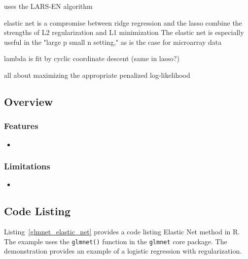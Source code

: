 uses the LARS-EN algorithm

elastic net is a compromise between ridge regression and the lasso
combine the strengths of L2 regularization and L1 minimization
The elastic net is especially useful in the "large p small n setting," as is the case for microarray data

lambda is fit by cyclic coordinate descent (same in lasso?)

all about maximizing the appropriate penalized log-likelihood

\subsection{Overview}

\subsubsection{Features}

\begin{itemize}
	\item 
\end{itemize}

\subsubsection{Limitations}

\begin{itemize}
	\item 
\end{itemize}


\subsection{Code Listing}
Listing~\ref{glmnet_elastic_net} provides a code listing Elastic Net method in R.
The example uses the \texttt{glmnet()} function in the \texttt{glmnet} core package. The demonstration provides an example of a logistic regression with regularization.






